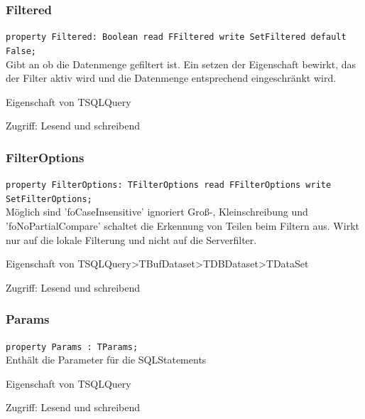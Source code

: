 \subsubsection{Filtered}
\begin{description}
  \item \texttt{property Filtered: Boolean read FFiltered write SetFiltered default False;}\\Gibt an ob die Datenmenge gefiltert ist. Ein setzen der Eigenschaft bewirkt, das der Filter aktiv wird und die Datenmenge entsprechend eingeschränkt wird. 
  \begin{description}
    \item Eigenschaft von TSQLQuery
  \end{description}
  \begin{description}
    \item Zugriff: Lesend und schreibend
  \end{description}
\end{description}

\subsubsection{FilterOptions}
\begin{description}
  \item \texttt{property FilterOptions: TFilterOptions read FFilterOptions write SetFilterOptions;}\\Möglich sind 'foCaseInsensitive' ignoriert Groß-, Kleinschreibung und 'foNoPartialCompare' schaltet die Erkennung von Teilen beim Filtern aus. Wirkt nur auf die lokale Filterung und nicht auf die Serverfilter.
  \begin{description}
    \item Eigenschaft von TSQLQuery>TBufDataset>TDBDataset>TDataSet
  \end{description}
  \begin{description}
    \item Zugriff: Lesend und schreibend
  \end{description}
\end{description}

\subsubsection{Params}
\begin{description}
  \item \texttt{property Params : TParams;}\\Enthält die Parameter für die SQLStatements
  \begin{description}
    \item Eigenschaft von TSQLQuery
  \end{description}
  \begin{description}
    \item Zugriff: Lesend und schreibend
  \end{description}
\end{description}

